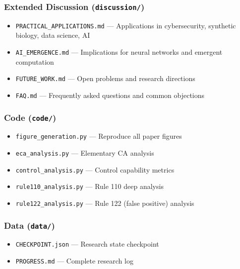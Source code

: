 \documentclass[
  11pt,
]{article}
\providecommand{\tightlist}{%
  \setlength{\itemsep}{0pt}\setlength{\parskip}{0pt}}
\begin{document}
\hypertarget{extended-discussion-discussion}{%
\subsubsection{\texorpdfstring{Extended Discussion
(\texttt{discussion/})}{Extended Discussion (discussion/)}}\label{extended-discussion-discussion}}

\begin{itemize}
\tightlist
\item
  \texttt{PRACTICAL\_APPLICATIONS.md} --- Applications in cybersecurity,
  synthetic biology, data science, AI
\item
  \texttt{AI\_EMERGENCE.md} --- Implications for neural networks and
  emergent computation
\item
  \texttt{FUTURE\_WORK.md} --- Open problems and research directions
\item
  \texttt{FAQ.md} --- Frequently asked questions and common objections
\end{itemize}

\hypertarget{code-code}{%
\subsubsection{\texorpdfstring{Code
(\texttt{code/})}{Code (code/)}}\label{code-code}}

\begin{itemize}
\tightlist
\item
  \texttt{figure\_generation.py} --- Reproduce all paper figures
\item
  \texttt{eca\_analysis.py} --- Elementary CA analysis
\item
  \texttt{control\_analysis.py} --- Control capability metrics
\item
  \texttt{rule110\_analysis.py} --- Rule 110 deep analysis
\item
  \texttt{rule122\_analysis.py} --- Rule 122 (false positive) analysis
\end{itemize}

\hypertarget{data-data}{%
\subsubsection{\texorpdfstring{Data
(\texttt{data/})}{Data (data/)}}\label{data-data}}

\begin{itemize}
\tightlist
\item
  \texttt{CHECKPOINT.json} --- Research state checkpoint
\item
  \texttt{PROGRESS.md} --- Complete research log
\end{itemize}
\end{document}
